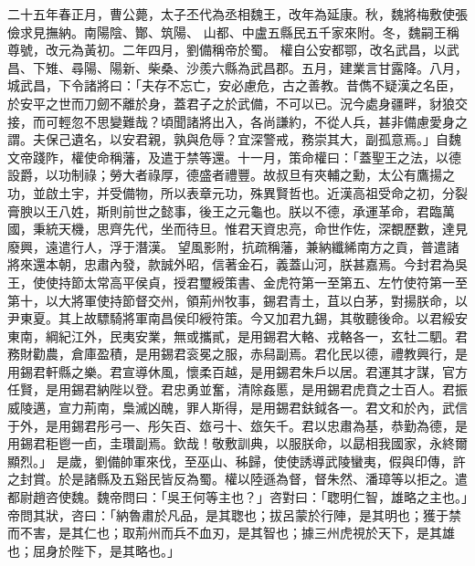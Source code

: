 \begin{pinyinscope}
 
二十五年春正月，曹公薨，太子丕代為丞相魏王，改年為延康。秋，魏將梅敷使張儉求見撫納。南陽陰、酇、筑陽、
 山都、中盧五縣民五千家來附。冬，魏嗣王稱尊號，改元為黃初。二年四月，劉備稱帝於蜀。
 權自公安都鄂，改名武昌，以武昌、下雉、尋陽、陽新、柴桑、沙羨六縣為武昌郡。五月，建業言甘露降。八月，城武昌，下令諸將曰：「夫存不忘亡，安必慮危，古之善教。昔儁不疑漢之名臣，於安平之世而刀劒不離於身，蓋君子之於武備，不可以已。況今處身疆畔，豺狼交接，而可輕忽不思變難哉？頃聞諸將出入，各尚謙約，不從人兵，甚非備慮愛身之謂。夫保己遺名，以安君親，孰與危辱？宜深警戒，務崇其大，副孤意焉。」自魏文帝踐阼，權使命稱藩，及遣于禁等還。十一月，策命權曰：「蓋聖王之法，以德設爵，以功制祿；勞大者祿厚，德盛者禮豐。故叔旦有夾輔之勳，太公有鷹揚之功，並啟土宇，并受備物，所以表章元功，殊異賢哲也。近漢高祖受命之初，分裂膏腴以王八姓，斯則前世之懿事，後王之元龜也。朕以不德，承運革命，君臨萬國，秉統天機，思齊先代，坐而待旦。惟君天資忠亮，命世作佐，深覩歷數，達見廢興，遠遣行人，浮于潛漢。
 望風影附，抗疏稱藩，兼納纖絺南方之貢，普遣諸將來還本朝，忠肅內發，款誠外昭，信著金石，義蓋山河，朕甚嘉焉。今封君為吳王，使使持節太常高平侯貞，授君璽綬策書、金虎符第一至第五、左竹使符第一至第十，以大將軍使持節督交州，領荊州牧事，錫君青土，苴以白茅，對揚朕命，以尹東夏。其上故驃騎將軍南昌侯印綬符策。今又加君九錫，其敬聽後命。以君綏安東南，綱紀江外，民夷安業，無或攜貳，是用錫君大輅、戎輅各一，玄牡二駟。君務財勸農，倉庫盈積，是用錫君衮冕之服，赤舄副焉。君化民以德，禮教興行，是用錫君軒縣之樂。君宣導休風，懷柔百越，是用錫君朱戶以居。君運其才謀，官方任賢，是用錫君納陛以登。君忠勇並奮，清除姦慝，是用錫君虎賁之士百人。君振威陵邁，宣力荊南，梟滅凶醜，罪人斯得，是用錫君鈇鉞各一。君文和於內，武信于外，是用錫君彤弓一、彤矢百、玈弓十、玈矢千。君以忠肅為基，恭勤為德，是用錫君秬鬯一卣，圭瓚副焉。欽哉！敬敷訓典，以服朕命，以勗相我國家，永終爾顯烈。」
 是歲，劉備帥軍來伐，至巫山、秭歸，使使誘導武陵蠻夷，假與印傳，許之封賞。於是諸縣及五谿民皆反為蜀。權以陸遜為督，督朱然、潘璋等以拒之。遣都尉趙咨使魏。魏帝問曰：「吳王何等主也？」咨對曰：「聦明仁智，雄略之主也。」帝問其狀，咨曰：「納魯肅於凡品，是其聦也；拔呂蒙於行陣，是其明也；獲于禁而不害，是其仁也；取荊州而兵不血刃，是其智也；據三州虎視於天下，是其雄也；屈身於陛下，是其略也。」

\end{pinyinscope}
